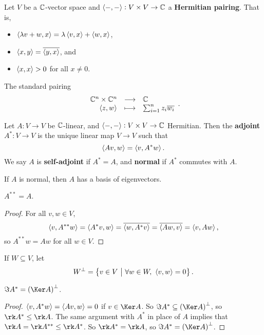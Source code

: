 Let $ V $ be a $ \mathbb{C} $-vector space and $ \left\langle -, - \right\rangle : V \times V \to \mathbb{C} $ a \textbf{Hermitian pairing}. That is,
\begin{itemize}
\item $ \left\langle \lambda v + w, x \right\rangle = \lambda\left\langle v, x \right\rangle + \left\langle w, x \right\rangle $,
\item $ \left\langle x, y \right\rangle = \overline{\left\langle y, x \right\rangle} $, and
\item $ \left\langle x, x \right\rangle > 0 $ for all $ x \ne 0 $.
\end{itemize}

\begin{example*}
The standard pairing
$$ \function{\CC^n \times \CC^n}{\CC}{\abr{z, w}}{\sum_{i = 1}^n z_i\overline{w_i}}. $$
\end{example*}

\begin{definition}
Let $ A : V \to V $ be $ \mathbb{C} $-linear, and $ \left\langle -, - \right\rangle : V \times V \to \mathbb{C} $ Hermitian. Then the \textbf{adjoint} $ A^* : V \to V $ is the unique linear map $ V \to V $ such that
$$ \left\langle Av, w \right\rangle = \left\langle v, A^*w \right\rangle. $$
We say $ A $ is \textbf{self-adjoint} if $ A^* = A $, and \textbf{normal} if $ A^* $ commutes with $ A $.
\end{definition}

\begin{theorem}
If $ A $ is normal, then $ A $ has a basis of eigenvectors.
\end{theorem}


\begin{lemma}
$ A^{**} = A $.
\end{lemma}

\begin{proof}
For all $ v, w \in V $,
$$ \left\langle v, A^{**}w \right\rangle = \left\langle A^*v, w \right\rangle = \overline{\left\langle w, A^*v \right\rangle} = \overline{\left\langle Aw, v \right\rangle} = \left\langle v, Aw \right\rangle, $$
so $ A^{**}w = Aw $ for all $ w \in V $.
\end{proof}

\begin{definition}
If $ W \subseteq V $, let
$$ W^\perp = \cbr{v \in V \st \forall w \in W, \ \abr{v, w} = 0}. $$
\end{definition}

\begin{proposition}
$ \Im A^* = \br{\Ker A}^\perp $.
\end{proposition}

\begin{proof}
$ \left\langle v, A^*w \right\rangle = \left\langle Av, w \right\rangle = 0 $ if $ v \in \Ker A $. So $ \Im A^* \subseteq \br{\Ker A}^\perp $, so $ \rk A^* \le \rk A $. The same argument with $ A^* $ in place of $ A $ implies that $ \rk A = \rk A^{**} \le \rk A^* $. So $ \rk A^* = \rk A $, so $ \Im A^* = \br{\Ker A}^\perp $.
\end{proof}

